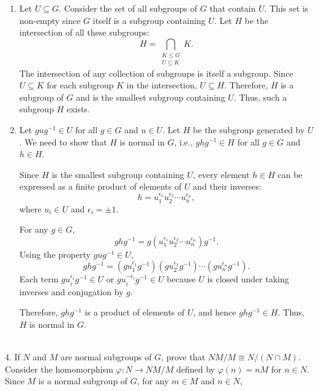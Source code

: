 \begin{enumerate}
    \item[\textit{(a)}] 
    Let \( U \subseteq G \). Consider the set of all subgroups of \( G \) that contain \( U \). This set is non-empty since \( G \) itself is a subgroup containing \( U \). Let \( H \) be the intersection of all these subgroups:
    \[
    H = \bigcap_{\substack{K \leq G \\ U \subseteq K}} K.
    \]
    The intersection of any collection of subgroups is itself a subgroup. Since \( U \subseteq K \) for each subgroup \( K \) in the intersection, \( U \subseteq H \). Therefore, \( H \) is a subgroup of \( G \) and is the smallest subgroup containing \( U \). Thus, such a subgroup \( H \) exists.
    
    \item[(b)] Let \( gug^{-1} \in U \) for all \( g \in G \) and \( u \in U \). Let \( H \) be the subgroup generated by \( U \). We need to show that \( H \) is normal in \( G \), i.e., \( ghg^{-1} \in H \) for all \( g \in G \) and \( h \in H \).
    
    Since \( H \) is the smallest subgroup containing \( U \), every element \( h \in H \) can be expressed as a finite product of elements of \( U \) and their inverses:
    \[
    h = u_1^{\epsilon_1} u_2^{\epsilon_2} \cdots u_n^{\epsilon_n},
    \]
    where \( u_i \in U \) and \( \epsilon_i = \pm 1 \).
    
    For any \( g \in G \),
    \[
    ghg^{-1} = g(u_1^{\epsilon_1} u_2^{\epsilon_2} \cdots u_n^{\epsilon_n})g^{-1}.
    \]
    Using the property \( gug^{-1} \in U \),
    \[
    ghg^{-1} = (gu_1^{\epsilon_1}g^{-1})(gu_2^{\epsilon_2}g^{-1}) \cdots (gu_n^{\epsilon_n}g^{-1}).
    \]
    Each term \( gu_i^{\epsilon_i}g^{-1} \in U \) or \( gu_i^{-\epsilon_i}g^{-1} \in U \) because \( U \) is closed under taking inverses and conjugation by \( g \).
    
    Therefore, \( ghg^{-1} \) is a product of elements of \( U \), and hence \( ghg^{-1} \in H \). Thus, \( H \) is normal in \( G \).\\\\
\end{enumerate}
4. If \( N \) and \( M \) are normal subgroups of \( G \), prove that \( NM / M \cong N / (N \cap M) \).
\\
Consider the homomorphism \(\varphi: N \to NM / M\) defined by \(\varphi(n) = nM\) for \(n \in N\).
\\
Since \(M\) is a normal subgroup of \(G\), for any \(m \in M\) and \(n \in N\),
